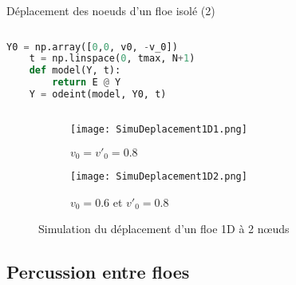 \begin{frame}[fragile]{Déplacement des noeuds d’un floe isolé (2)}

    \begin{columns}[onlytextwidth]
		
		\small
        \begin{column}{0.4\textwidth}
            \begin{lstlisting}[language=Python,captionpos=b,caption=Code de simulation]
    Y0 = np.array([0,0, v0, -v_0])
    t = np.linspace(0, tmax, N+1)
    def model(Y, t):
        return E @ Y
    Y = odeint(model, Y0, t)
            \end{lstlisting}
        \end{column}

		\normalsize
    \end{columns}
    

    
    \begin{figure}[!h]
        \centering
        \begin{subfigure}[t]{0.45\textwidth}
            \centering
            \texttt{[image: SimuDeplacement1D1.png]}
            \caption{$v_0=v'_0 = 0.8$}
        \end{subfigure}
        \begin{subfigure}[t]{0.45\textwidth}
            \centering
            \texttt{[image: SimuDeplacement1D2.png]}
            \caption{$v_0= 0.6$ et $v'_0 = 0.8$}
        \end{subfigure}    
        \caption{Simulation du déplacement d'un floe 1D à 2 n\oe{}uds}
    \end{figure}

\end{frame}





\subsection{Percussion entre floes}



